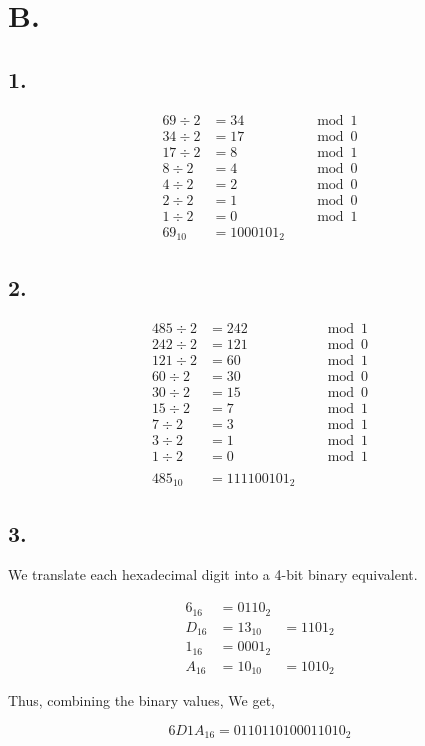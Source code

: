 \documentclass[10pt]{article}
\begin{document}
\pagebreak
\section*{B.}
\subsection*{1.}

$$
\begin{aligned}
69 \div 2 &= 34 &\quad \bmod 1 \\
34 \div 2 &= 17 &\quad \bmod 0 \\
17 \div 2 &= 8  &\quad \bmod 1 \\
8 \div 2  &= 4  &\quad \bmod 0 \\
4 \div 2  &= 2  &\quad \bmod 0 \\
2 \div 2  &= 1  &\quad \bmod 0 \\
1 \div 2  &= 0  &\quad \bmod 1 \\
69_{10}   &= 1000101_{2}
\end{aligned}
$$

\subsection*{2.}

$$
\begin{array}{rlr}
485 \div 2 & =242 &\quad \bmod 1 \\
242 \div 2 & =121 &\quad \bmod 0 \\
121 \div 2 & =60 &\quad \bmod 1 \\
60 \div 2 & =30 &\quad \bmod 0 \\
30 \div 2 & =15 &\quad \bmod 0 \\
15 \div 2 & =7 &\quad \bmod 1 \\
7 \div 2 & =3 &\quad \bmod 1 \\
3 \div 2 & =1 &\quad \bmod 1 \\
1 \div 2 & =0 &\quad \bmod 1 \\
& \\
485_{10} & =111100101_{2}
\end{array}
$$

\subsection*{3.}

\begin{flushleft}
We translate each hexadecimal digit into a 4-bit binary equivalent.

$$
\begin{aligned}
6_{16} &= 0110_{2} \\
D_{16} &= 13_{10} &= 1101_{2} \\
1_{16} &= 0001_{2} \\
A_{16} &= 10_{10} &= 1010_{2}
\end{aligned}
$$

Thus, combining the binary values, We get,

$$
6 D 1 A_{16}=0110110100011010_{2}
$$
\end{flushleft}
\end{document}
